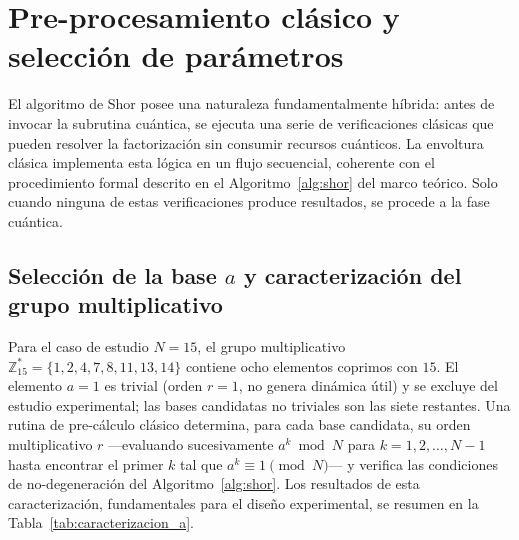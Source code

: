 \documentclass[12pt, spanish]{book}
\begin{document}
\section{Pre-procesamiento clásico y selección de parámetros}
\label{sec:preprocesamiento_parametros}

El algoritmo de Shor posee una naturaleza fundamentalmente híbrida: antes de invocar la subrutina cuántica, se ejecuta una serie de verificaciones clásicas que pueden resolver la factorización sin consumir recursos cuánticos. La envoltura clásica implementa esta lógica en un flujo secuencial, coherente con el procedimiento formal descrito en el Algoritmo~\ref{alg:shor} del marco teórico. Solo cuando ninguna de estas verificaciones produce resultados, se procede a la fase cuántica.

\subsection{Selección de la base $a$ y caracterización del grupo multiplicativo}

Para el caso de estudio $N = 15$, el grupo multiplicativo $\mathbb{Z}_{15}^* = \{1, 2, 4, 7, 8, 11, 13, 14\}$ contiene ocho elementos coprimos con $15$. El elemento $a = 1$ es trivial (orden $r = 1$, no genera dinámica útil) y se excluye del estudio experimental; las bases candidatas no triviales son las siete restantes. Una rutina de pre-cálculo clásico determina, para cada base candidata, su orden multiplicativo $r$ ---evaluando sucesivamente $a^k \bmod N$ para $k = 1, 2, \ldots, N-1$ hasta encontrar el primer $k$ tal que $a^k \equiv 1 \pmod{N}$--- y verifica las condiciones de no-degeneración del Algoritmo~\ref{alg:shor}. Los resultados de esta caracterización, fundamentales para el diseño experimental, se resumen en la Tabla~\ref{tab:caracterizacion_a}.
\end{document}
